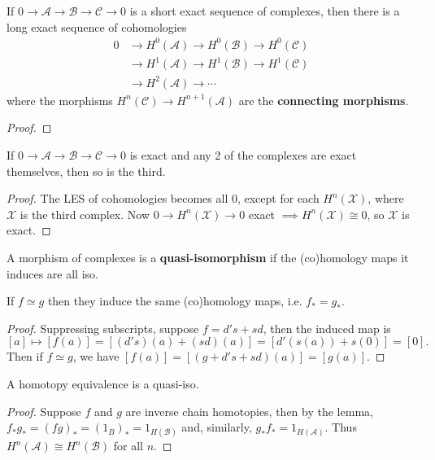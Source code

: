 \documentclass[twoside,10pt]{report}
\begin{document}

\begin{thrm}
If $0\to \mathcal{A}\to \mathcal{B}\to \mathcal{C}\to 0$ is a short exact sequence of complexes, then there is a long exact sequence of cohomologies
\begin{align*}
	0 &\to H^{0}(\mathcal{A})\to H^{0}(\mathcal{B})\to H^{0}(\mathcal{C}) \\
	  &\to H^{1}(\mathcal{A})\to H^{1}(\mathcal{B})\to H^{1}(\mathcal{C}) \\
	  &\to H^{2}(\mathcal{A})\to \cdots
\end{align*}
where the morphisms $H^{n}(\mathcal{C})\to H^{n+1}(\mathcal{A})$ are the \textbf{connecting morphisms}.
\end{thrm}
\begin{proof}

\end{proof}

\begin{cor}
If $0\to \mathcal{A}\to \mathcal{B}\to \mathcal{C}\to 0$ is exact and any 2 of the complexes are exact themselves, then so is the third.
\end{cor}
\begin{proof}
	The LES of cohomologies becomes all 0, except for each $H^{n}(\mathcal{X})$, where $\mathcal{X}$ is the third complex. Now $0\to H^{n}(\mathcal{X})\to 0$ exact $\implies H^{n}(\mathcal{X}) \cong 0$, so $\mathcal{X}$ is exact.
\end{proof}

\begin{defn}[]
	A morphism of complexes is a \textbf{quasi-isomorphism} if the (co)homology maps it induces are all iso.
\end{defn}

\begin{lem}
	If $f\simeq g$ then they induce the same (co)homology maps, i.e. $f_{*}=g_{*}$.
\end{lem}
\begin{proof}
	Suppressing subscripts, suppose $f = d's + sd$, then the induced map is
	\[
		[a] \mapsto [f(a)] = [(d's)(a) + (sd)(a)] = [d'(s(a)) + s(0)] = [0].
	\] Then if $f \simeq g$, we have $[f(a)] = [(g+d's+sd)(a)] = [g(a)]$.
\end{proof}

\begin{prop}
	\label{homotopy-quasi}
A homotopy equivalence is a quasi-iso.
\end{prop}
\begin{proof}
	Suppose $f$ and $g$ are inverse chain homotopies, then by the lemma, $f_{*}g_{*} = (fg)_{*} = (1_{B})_{*} = 1_{H(\mathcal{B})}$ and, similarly, $g_{*}f_{*}=1_{H(\mathcal{A})}$. Thus $H^n(\mathcal{A}) \cong H^n(\mathcal{B})$ for all $n$.
\end{proof}
\end{document}

